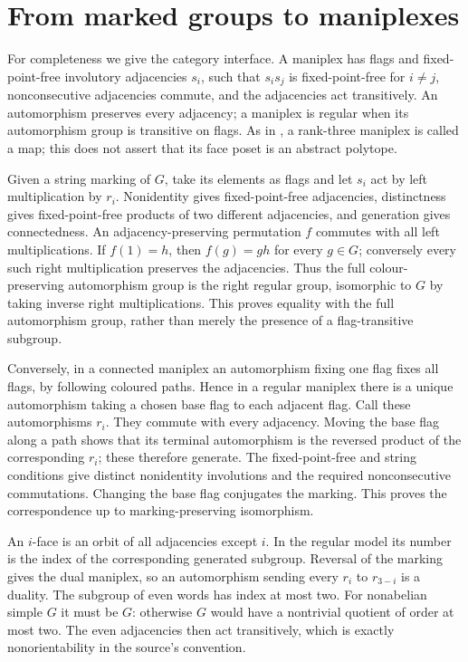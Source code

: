 \documentclass[11pt]{article}
\begin{document}
\section{From marked groups to maniplexes}
For completeness we give the category interface. A maniplex has flags and
fixed-point-free involutory adjacencies $s_i$, such that $s_i s_j$ is
fixed-point-free for $i\ne j$, nonconsecutive adjacencies commute, and the
adjacencies act transitively. An automorphism preserves every adjacency;
a maniplex is regular when its automorphism group is transitive on flags.
As in \cite[Remark~2.1]{LT}, a rank-three maniplex is called a map; this
does not assert that its face poset is an abstract polytope.

Given a string marking of $G$, take its elements as flags and let $s_i$
act by left multiplication by $r_i$. Nonidentity gives fixed-point-free
adjacencies, distinctness gives fixed-point-free products of two different
adjacencies, and generation gives connectedness. An adjacency-preserving
permutation $f$ commutes with all left multiplications. If $f(1)=h$, then
$f(g)=gh$ for every $g\in G$; conversely every such right multiplication
preserves the adjacencies. Thus the full colour-preserving automorphism
group is the right regular group, isomorphic to $G$ by taking inverse
right multiplications. This proves equality with the full automorphism
group, rather than merely the presence of a flag-transitive subgroup.

Conversely, in a connected maniplex an automorphism fixing one flag fixes
all flags, by following coloured paths. Hence in a regular maniplex there
is a unique automorphism taking a chosen base flag to each adjacent flag.
Call these automorphisms $r_i$. They commute with every adjacency. Moving
the base flag along a path shows that its terminal automorphism is the
reversed product of the corresponding $r_i$; these therefore generate.
The fixed-point-free and string conditions give distinct nonidentity
involutions and the required nonconsecutive commutations. Changing the
base flag conjugates the marking. This proves the correspondence up to
marking-preserving isomorphism.

An $i$-face is an orbit of all adjacencies except $i$. In the regular model
its number is the index of the corresponding generated subgroup. Reversal
of the marking gives the dual maniplex, so an automorphism sending every
$r_i$ to $r_{3-i}$ is a duality. The subgroup of even words has index at
most two. For nonabelian simple $G$ it must be $G$: otherwise $G$ would
have a nontrivial quotient of order at most two. The even adjacencies then
act transitively, which is exactly nonorientability in the source's
convention.
\end{document}
